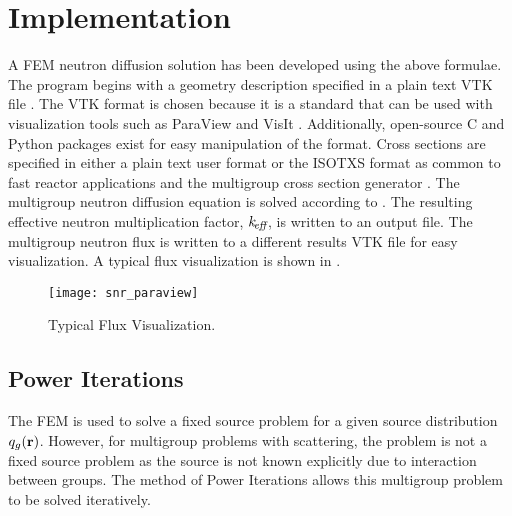 \section{Implementation}
  A FEM neutron diffusion solution has been developed using 
  the above formulae. The program begins with a geometry description specified
  in a plain text VTK file \cite{vtk}. The VTK format is chosen because it is a
  standard that can be used with visualization tools such as ParaView
  \cite{ParaView} and VisIt \cite{VisIt}. Additionally, open-source C and Python
  packages exist for easy manipulation of the format. Cross sections are 
  specified in either a plain text user format or the ISOTXS format as common to 
  fast reactor applications and the multigroup cross section generator \mcc 
  \cite{mcc}. The multigroup neutron diffusion equation is solved according to 
  . The resulting effective neutron multiplication 
  factor, $k_{\!\mbox{\scriptsize \em eff}}$, is written to an output file. The multigroup neutron flux is
  written to a different results VTK file for easy visualization. A typical flux 
  visualization is shown in .

  \begin{figure}
    \centering
    \texttt{[image: snr\_paraview]}
    \caption{Typical Flux Visualization.}
    \label{fig:snr_paraview}
  \end{figure}

  \subsection{Power Iterations}
    \label{sec:power_iterations}
    The FEM is used to solve a fixed source problem for a given source
    distribution $q_g(\mathbf{r})$. However, for multigroup problems with scattering, 
    the problem is not a fixed source problem as the source is not known
    explicitly due to interaction between groups. The method of Power Iterations
    allows this multigroup problem to be solved iteratively.


